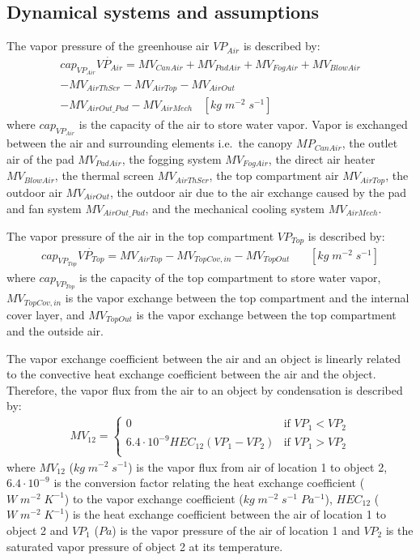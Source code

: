 \documentclass[a4paper]{article}
\begin{document}
\subsection{Dynamical systems and assumptions}
The vapor pressure of the greenhouse air \(VP_{Air}\) is described by:
\begin{multline*}
  cap_{VP_{Air}}\dot{VP_{Air}} = MV_{CanAir} + MV_{PadAir} + MV_{FogAir} + MV_{BlowAir} \\
  - MV_{AirThScr} - MV_{AirTop} - MV_{AirOut} \\
  - MV_{AirOut\_Pad} - MV_{AirMech} ~~~~ [kg\;m^{-2}\;s^{-1}]
\end{multline*}
where \(cap_{VP_{Air}}\) is the capacity of the air to store water vapor.
Vapor is exchanged between the air and surrounding elements i.e.\ the canopy \(MP_{CanAir}\), the outlet air of the pad \(MV_{PadAir}\), the fogging system \(MV_{FogAir}\), the direct air heater \(MV_{BlowAir}\), the thermal screen \(MV_{AirThScr}\), the top compartment air \(MV_{AirTop}\), the outdoor air \(MV_{AirOut}\), the outdoor air due to the air exchange caused by the pad and fan system \(MV_{AirOut\_Pad}\), and the mechanical cooling system \(MV_{AirMech}\).

The vapor pressure of the air in the top compartment \(VP_{Top}\) is described by:
\begin{multline*}
  cap_{VP_{Top}}\dot{VP_{Top}} = MV_{AirTop} - MV_{TopCov,in} - MV_{TopOut} ~~~~~~~~ [kg\;m^{-2}\;s^{-1}]
\end{multline*}
where \(cap_{VP_{Top}}\) is the capacity of the top compartment to store water vapor, \(MV_{TopCov,in}\) is the vapor exchange between the top compartment and the internal cover layer, and \(MV_{TopOut}\) is the vapor exchange between the top compartment and the outside air.

The vapor exchange coefficient between the air and an object is linearly related to the convective heat exchange coefficient between the air and the object.
Therefore, the vapor flux from the air to an object by condensation is described by:
\begin{align}
  \label{eq:vapor_conden}
  MV_{12} = \begin{cases}
    0                                       & \text{if~} VP_1 < VP_2 \\
    6.4 \cdot 10^{-9} HEC_{12}(VP_1 - VP_2) & \text{if~} VP_1 > VP_2 \\
  \end{cases}
\end{align}
where \(MV_{12}\) (\(kg\;m^{-2}\;s^{-1}\)) is the vapor flux from air of location 1 to object 2, \(6.4 \cdot 10^{-9}\) is the conversion factor relating the heat exchange coefficient (\(W\;m^{-2}\;K^{-1}\)) to the vapor exchange coefficient (\(kg\;m^{-2}\;s^{-1}\;Pa^{-1}\)), \(HEC_{12}\) (\(W\;m^{-2}\;K^{-1}\)) is the heat exchange coefficient between the air of location 1 to object 2 and \(VP_1\) (\(Pa\)) is the vapor pressure of the air of location 1 and \(VP_2\) is the saturated vapor pressure of object 2 at its temperature.
\end{document}
